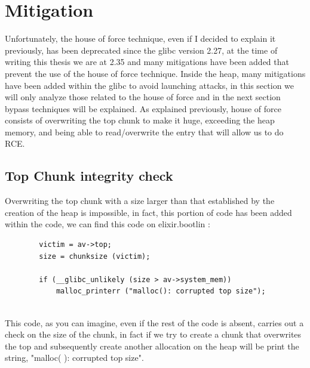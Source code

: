     \section{Mitigation}
    Unfortunately, the house of force technique, even if I decided to explain it previously, has been deprecated since the glibc version 2.27, at the time of writing this thesis we are at 2.35 and many mitigations have been added that prevent the use of the house of force technique.\newline
    Inside the heap, many mitigations have been added within the glibc to avoid launching attacks, in this section we will only analyze those related to the house of force and in the next section bypass techniques will be explained.\newline
    As explained previously, house of force consists of overwriting the top chunk to make it huge, exceeding the heap memory, and being able to read/overwrite the entry that will allow us to do RCE.\newline
    \subsection{Top Chunk integrity check}
    Overwriting the top chunk with a size larger than that established by the creation of the heap is impossible, in fact, this portion of code has been added within the code, we can find this code on elixir.bootlin \cite{elixir.bootlin}:\newline
    \begin{verbatim}
        victim = av->top;
        size = chunksize (victim);
    
        if (__glibc_unlikely (size > av->system_mem))
            malloc_printerr ("malloc(): corrupted top size");
  
    \end{verbatim}
    This code, as you can imagine, even if the rest of the code is absent, carries out a check on the size of the chunk, in fact if we try to create a chunk that overwrites the top and subsequently create another allocation on the heap will be print the string, "malloc( ): corrupted top size".
